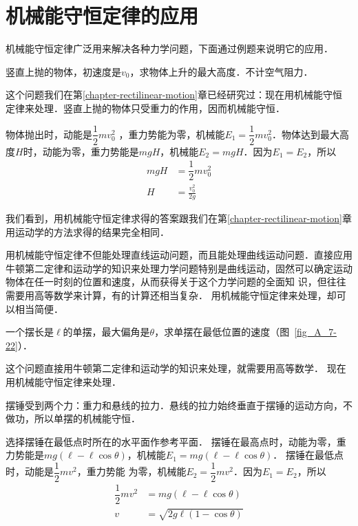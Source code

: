 \section{机械能守恒定律的应用}

机械能守恒定律广泛用来解决各种力学问题，下面通过例题来说明它的应用．


\begin{example}
    竖直上抛的物体，初速度是$v_0$，求物体上升的最大高度．不计空气阻力．
\end{example}


\begin{solution}
    这个问题我们在第\ref{chapter-rectilinear-motion}章已经研究过：现在用机械能守恒
定律来处理．竖直上抛的物体只受重力的作用，因而机械能守恒．

物体抛出时，动能是$\dfrac{1}{2}mv^2_0$ ，重力势能为零，机械能$E_1=\dfrac{1}{2}mv^2_0$．物体达到最大高度$H$时，动能为零，重力势能是$mgH$，机械能$E_2=mgH$．因为$E_1=E_2$，所以
\[\begin{split}
    mgH&=\dfrac{1}{2}mv^2_0\\
    H&=\frac{v^2_0}{2g}
\end{split}\]
\end{solution}

我们看到，用机械能守恒定律求得的答案跟我们在第\ref{chapter-rectilinear-motion}章用运动学的方法求得的结果完全相同．

用机械能守恒定律不但能处理直线运动问题，而且能处理曲线运动问题．直接应用牛顿第二定律和运动学的知识来处理力学问题特别是曲线运动，固然可以确定运动物体在任一时刻的位置和速度，从而获得关于这个力学问题的全面知
识，但往往需要用高等数学来计算，有的计算还相当复杂．
用机械能守恒定律来处理，却可以相当简便．


\begin{example}
    一个摆长是$\ell$的单摆，最大偏角是$\theta$，求单摆在最低位置的速度（图~\ref{fig_A_7-22}）．
\end{example}


\begin{solution}
    这个问题直接用牛顿第二定律和运动学的知识来处理，就需要用高等数学．
    现在用机械能守恒定律来处理．

摆锤受到两个力：重力和悬线的拉力．悬线的拉力始终垂直于摆锤的运动方向，不做功，所以单摆的机械能守恒．

选择摆锤在最低点时所在的水平面作参考平面．
摆锤在最高点时，动能为零，重力势能是$mg(\ell-\ell\cos\theta)$，机械能$E_1=mg(\ell-\ell\cos\theta)$． 摆锤在最低点时，动能是$\dfrac{1}{2}mv^2$，重力势能
为零，机械能$E_2=\dfrac{1}{2}mv^2$．因为$E_1=E_2$，所以
\[\begin{split}
    \dfrac{1}{2}mv^2&=mg(\ell-\ell\cos\theta)\\
    v&=\sqrt{2g\ell(1-\cos\theta)}
\end{split}\]
\end{solution}

